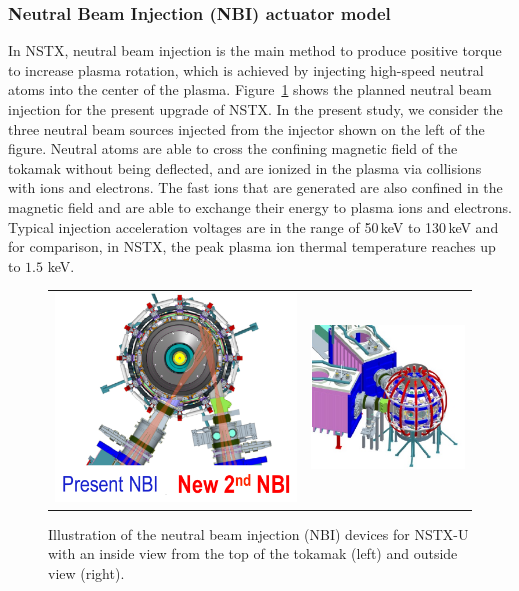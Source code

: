 \documentclass[12pt]{iopart}
\begin{document}
\subsubsection{Neutral Beam Injection (NBI) actuator model}
 \label{NBIAM}

In NSTX, neutral beam injection is the main method to produce positive torque to increase plasma rotation, which is achieved  by injecting high-speed neutral atoms into the center of the plasma. Figure~{\ref{NBI_pics}} shows the planned neutral beam injection for the present upgrade of NSTX. In the present study, we consider the three neutral beam sources injected from the injector shown on the left of the figure.
 Neutral atoms are able to cross the confining magnetic field of the tokamak without being deflected, and are ionized in the plasma via collisions with ions and electrons. The fast ions that are generated are also confined in the magnetic field and are able to exchange their energy to plasma ions and electrons. Typical injection acceleration voltages are in the range of 50\,keV to 130\,keV and for comparison, in NSTX, the peak plasma ion thermal temperature reaches up to $1.5$ keV.

\begin{figure}
\begin{tabular}{cc}
\includegraphics[width=0.5\linewidth]{imene_figs/pic_NBI1} &
\includegraphics[width=0.4\linewidth]{imene_figs/pic_NBI2}
\end{tabular}
\caption{Illustration of the neutral beam injection (NBI) devices for NSTX-U with an inside view from the top of the tokamak (left) and outside view (right). }
\label{NBI_pics}
\end{figure}
\end{document}
